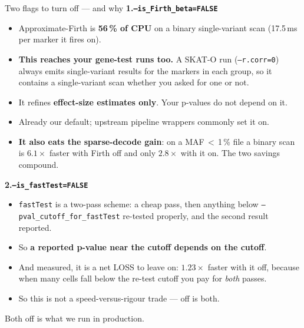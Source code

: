 \documentclass[aspectratio=169,11pt]{beamer}
\begin{document}
\begin{frame}{Two flags to turn off --- and why}
\textbf{1.\quad\texttt{--is\_Firth\_beta=FALSE}}
\begin{itemize}
  \item Approximate-Firth is \textbf{56\,\% of CPU} on a binary single-variant
        scan (17.5\,ms per marker it fires on).
  \item \textbf{This reaches your gene-test runs too.} A SKAT-O run
        (\texttt{--r.corr=0}) always emits single-variant results for the markers
        in each group, so it contains a single-variant scan whether you asked for
        one or not.
  \item It refines \textbf{effect-size estimates only}. Your p-values do not
        depend on it.
  \item Already our default; upstream pipeline wrappers commonly set it on.
  \item \textbf{It also eats the sparse-decode gain}: on a MAF\,$<$\,1\,\% file a
        binary scan is $6.1\times$ faster with Firth off and only $2.8\times$ with
        it on. The two savings compound.
\end{itemize}

\medskip
\textbf{2.\quad\texttt{--is\_fastTest=FALSE}}
\begin{itemize}
  \item \texttt{fastTest} is a two-pass scheme: a cheap pass, then anything below
        \texttt{--pval\_cutoff\_for\_fastTest} re-tested properly, and the second
        result reported.
  \item So \textbf{a reported p-value near the cutoff depends on the cutoff}.
  \item \alert{And measured, it is a net LOSS to leave on}: $1.23\times$ faster
        with it off, because when many cells fall below the re-test cutoff you pay
        for \emph{both} passes.
  \item So this is not a speed-versus-rigour trade --- off is both.
\end{itemize}

\medskip
\begin{center}
Both off is what we run in production.
\end{center}
\end{frame}
\end{document}
